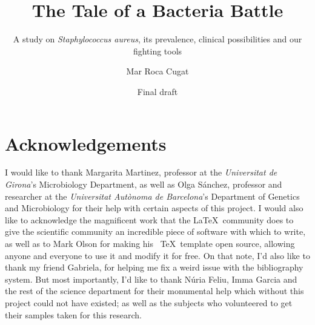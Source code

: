 \documentclass[fontsize=12pt,twoside=semi,openright,numbers=noenddot,parskip=half]{scrbook}
\title{The Tale of a Bacteria Battle}
\subtitle{A study on \emph{Staphylococcus aureus}, its prevalence, clinical possibilities and our fighting tools}
\author{Mar Roca Cugat}
\date{Final draft}
\begin{document}
\maketitle
\cleardoublepage
\renewcommand{\thepage}{\arabic{page}}
\frontmatter
\chapter{Acknowledgements}
\begin{center}
I would like to thank Margarita Martinez, professor at the \emph{Universitat de Girona}'s Microbiology Department, as well as Olga Sánchez, professor and researcher at the \emph{Universitat Autònoma de Barcelona}'s Department of Genetics and Microbiology for their help with certain aspects of this project. \newline
I would also like to acknowledge the magnificent work that the \LaTeX\ community does to give the scientific community an incredible piece of software with which to write, as well as to Mark Olson for making his \KOMAScript\ \TeX\ template open source, allowing anyone and everyone to use it and modify it for free. On that note, I'd also like to thank my friend Gabriela, for helping me fix a weird issue with the bibliography system.\newline
But most importantly, I'd like to thank Núria Feliu, Imma Garcia and the rest of the science department for their monumental help which without this project could not have existed; as well as the subjects who volunteered to get their samples taken for this research.\newline
\end{center}
\mainmatter\printindex\tableofcontents





%
%
\backmatter
\renewcommand{\thepage}{\Roman{page}}\setcounter{page}{0}
\clearpage
\printbibliography[title={Works referenced}]
\end{document}

